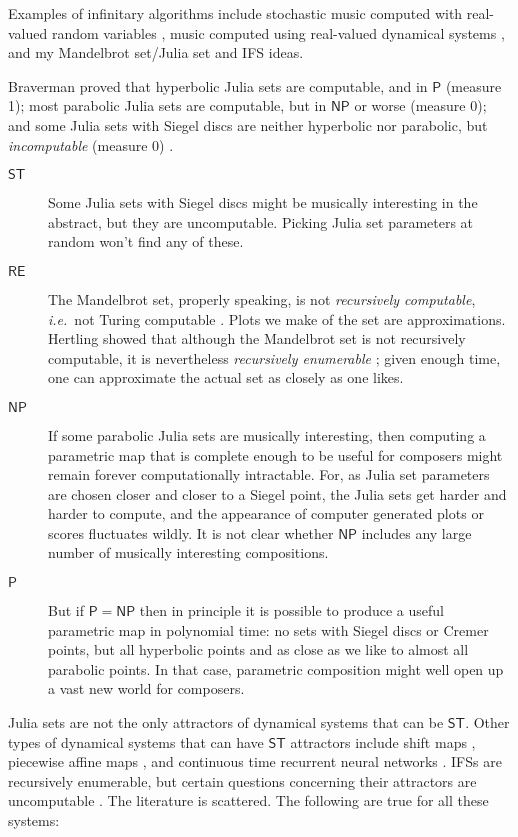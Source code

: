 \documentclass[11pt,papersize=a4]{scrartcl}
\begin{document}
Examples of infinitary algorithms include stochastic music computed with real-valued random variables \parencite{xenakis2001formalized}, music computed using real-valued dynamical systems \parencite{gardner1978fractal, beyls1991chaos}, and my Mandelbrot set/Julia set and IFS ideas. 

Braverman proved that hyperbolic Julia sets are computable, and in $\mathsf{P}$ (measure 1); most parabolic Julia sets are computable, but in $\mathsf{NP}$ or worse (measure 0); and some Julia sets with Siegel discs are neither hyperbolic nor parabolic, but \emph{incomputable} (measure 0) \parencite{braverman2006non, braverman2008computability, braverman2009computability}.
\begin{description}
\item[$\mathsf{ST}$]  Some Julia sets with Siegel discs might be musically interesting in the abstract, but they are uncomputable. Picking Julia set parameters at random won't find any of these.
\item[$\mathsf{RE}$] The Mandelbrot set, properly speaking, is not \emph{recursively computable}, \emph{i.e.}\ not Turing computable \parencite{blum1993godel}. Plots we make of the set are approximations. Hertling showed that although the Mandelbrot set is not recursively computable, it is nevertheless \emph{recursively enumerable} \parencite{Hertling2005-HERITM-3}; given enough time, one can approximate the actual set as closely as one likes. 
\item[$\mathsf{NP}$] If some parabolic Julia sets are musically interesting, then computing a parametric map that is complete enough to be useful for composers might remain forever computationally intractable. For, as Julia set parameters are chosen closer and closer to a Siegel point, the Julia sets get harder and harder to compute, and the appearance of computer generated plots or scores fluctuates wildly. It is not clear whether $\mathsf{NP}$ includes any large number of musically interesting compositions.
\item[$\mathsf{P}$] But if $\mathsf{P} = \mathsf{NP}$ then in principle it is possible to produce a useful parametric map in polynomial time: no sets with Siegel discs or Cremer points, but all hyperbolic points and as close as we like to almost all parabolic points. In that case, parametric composition might well open up a vast new world for composers.
\end{description}

Julia sets are not the only attractors of dynamical systems that can be $\mathsf{ST}$. Other types of dynamical systems that can have $\mathsf{ST}$ attractors include shift maps \parencite{moore1991generalized}, piecewise affine maps \parencite{Bazille_2018}, and continuous time recurrent neural networks \parencite{10531294}. IFSs are recursively enumerable, but certain questions concerning their attractors are uncomputable \parencite{dube1993undecidable}. The literature is scattered. The following are true for all these systems:
\end{document}
